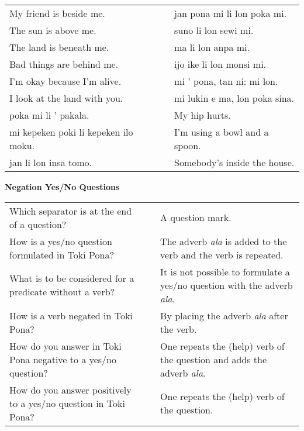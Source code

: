 \begin{supertabular}{p{5,5cm}|ll}
My friend is beside me. && jan pona mi li lon poka mi. \\ %
The sun is above me. && suno li lon sewi mi. \\ %
The land is beneath me. && ma li lon anpa mi. \\ %
Bad things are behind me. && ijo ike li lon monsi mi. \\ %
I'm okay because I'm alive. && mi ' pona, tan ni: mi lon. \\ %
I look at the land with you.  && mi lukin e ma, lon poka sina. \\ %
poka mi li ' pakala.  && My hip hurts. \\
mi kepeken poki li kepeken ilo moku.  && I'm using a bowl and a spoon. \\
jan li lon insa tomo.  && Somebody's inside the house. \\
\end{supertabular} 

\textbf{Negation Yes/No Questions} 
\label{'negation_yes_no_questions'}

\begin{supertabular}{p{5,5cm}|ll}
Which separator is at the end of a question? && A question mark. \\ %
How is a yes/no question formulated in Toki Pona? && The adverb \textit{ala} is added to the verb and the verb is repeated.  \\ %
What is to be considered for a predicate without a verb? &&  It is not possible to formulate a yes/no question with the adverb \textit{ala}. \\ %
How is a verb negated in Toki Pona? && By placing the adverb \textit{ala} after the verb.  \\ %
How do you answer in Toki Pona negative to a yes/no question? && One repeats the (help) verb of the question and adds the adverb \textit{ala}. \\ %
How do you answer positively to a yes/no question in Toki Pona? && One repeats the (help) verb of the question. \\ %
\end{supertabular} 

